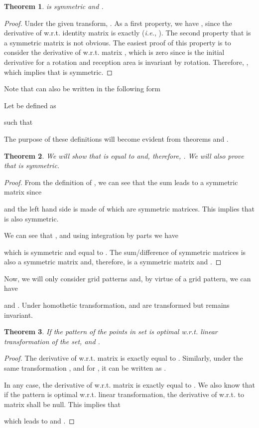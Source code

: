 \documentclass[12pt,english]{article}
\newtheorem{theorem}{Theorem}[section]
\begin{document}
\begin{theorem}
 is symmetric and .
\end{theorem}

\begin{proof}
Under the given transform, . As a first property, we have \mbox{}, since the derivative of  w.r.t. identity matrix  is exactly  ({\it i.e.}, {}). The second property that  is a symmetric matrix is not obvious. The easiest proof of this property is to consider the derivative of  w.r.t. matrix \mbox{},
which is zero since  is the initial derivative for a rotation and reception area is invariant by rotation. 
Therefore, \mbox{}, which implies that  is symmetric. 
\end{proof}

Note that  can also be written in the following form

Let  be defined as

such that

The purpose of these definitions will become evident from theorems  and .

\begin{theorem}
We will show that  is equal to  and, therefore, . We will also prove that  is symmetric. 
\end{theorem}

\begin{proof}
From the definition of , we can see that the sum \mbox{} leads to a symmetric matrix since

and the left hand side is made of \mbox{} which are symmetric matrices. This implies that  is also symmetric.

We can see that \mbox{}, and using integration by parts we have

which is symmetric and equal to . The sum/difference of symmetric matrices is also a symmetric matrix and, therefore,  is a symmetric matrix and . 
\end{proof}



Now, we will only consider grid patterns and, by virtue of a grid pattern, we can have 
 
and \mbox{}. Under homothetic transformation,  and  are transformed but  remains invariant.

\begin{theorem}
If the pattern of the points in set  is optimal w.r.t. linear transformation of the set,  and .
\end{theorem}

\begin{proof}
The derivative of  w.r.t. matrix  is exactly equal to . 
Similarly, under the same transformation
,
and for , it can be written as .

In any case, the derivative of  w.r.t. matrix  is exactly equal to . 
We also know that if the pattern is optimal w.r.t. linear transformation, the derivative of  w.r.t. to matrix  shall be null. This implies that

which leads to  and .
\end{proof}
\end{document}
